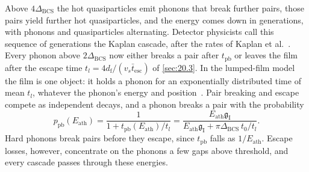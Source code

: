 Above $4\Delta_{\mathrm{BCS}}$ the hot quasiparticles emit phonons that break further pairs, those pairs yield further hot quasiparticles, and the energy comes down in generations, with phonons and quasiparticles alternating. Detector physicists call this sequence of generations the Kaplan cascade, after the rates of Kaplan et al.~\cite{kaplan1976quasiparticle}. Every phonon above $2\Delta_{\mathrm{BCS}}$ now either breaks a pair after $t_{\mathrm{pb}}$ or leaves the film after the escape time $t_l = 4d_{\mathrm{f}}/(v_s\bar t_{\mathrm{esc}})$ of \cref{sec:20.3}. In the lumped-film model the film is one object: it holds a phonon for an exponentially distributed time of mean $t_l$, whatever the phonon's energy and position~\cite[p.~2]{guruswamy2014quasiparticle}. Pair breaking and escape compete as independent decays, and a phonon breaks a pair with the probability
\begin{equation}
  p_{\mathrm{pb}}(E_{\mathrm{ath}}) = \frac{1}{1 + t_{\mathrm{pb}}(E_{\mathrm{ath}})/t_l}
  = \frac{E_{\mathrm{ath}}\mathfrak{g}_{\mathrm{I}}}{E_{\mathrm{ath}}\mathfrak{g}_{\mathrm{I}} + \pi\Delta_{\mathrm{BCS}}\,t_0/t_l} .
  \label{eq:20.4-ppb}
\end{equation}
Hard phonons break pairs before they escape, since $t_{\mathrm{pb}}$ falls as $1/E_{\mathrm{ath}}$. Escape losses, however, concentrate on the phonons a few gaps above threshold, and every cascade passes through these energies.


